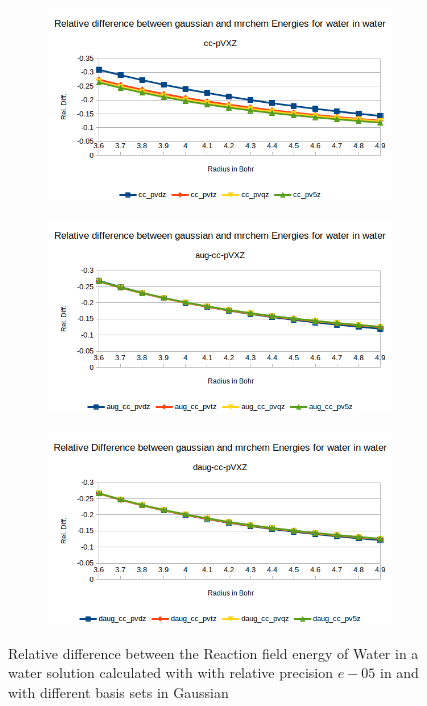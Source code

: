 \documentclass[../master_thesis.tex]{subfiles}
\begin{document}
\begin{figure}[h!]
  \centering
  \begin{subfigure}[b]{0.75\linewidth}
    \includegraphics[width=\linewidth]{img/watreldiff.png}
  \end{subfigure}
  \begin{subfigure}[b]{0.75\linewidth}
    \includegraphics[width=\linewidth]{img/wataugreldiff.png}
  \end{subfigure}
  \begin{subfigure}[b]{0.75\linewidth}
    \includegraphics[width=\linewidth]{img/watdaugreldiff.png}
  \end{subfigure}
  \caption{Relative difference between the Reaction field energy of Water in a water solution calculated with with relative precision $e-05$ in \mrchem
   and with different basis sets in Gaussian}
  \label{fig:watreldiff}
\end{figure}
\end{document}
